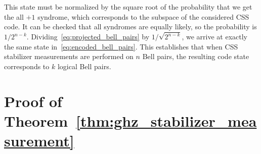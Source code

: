 \documentclass[journal,onecolumn]{IEEEtran}
\begin{document}
This state must be normalized by the square root of the probability that we get the all $+1$ syndrome, which corresponds to the subspace of the considered CSS code.
It can be checked that all syndromes are equally likely, so the probability is $1/2^{n-k}$.
Dividing~\eqref{eq:projected_bell_pairs} by $1/\sqrt{2^{n-k}}$, we arrive at exactly the same state in~\eqref{eq:encoded_bell_pairs}.
This establishes that when CSS stabilizer measurements are performed on $n$ Bell pairs, the resulting code state corresponds to $k$ logical Bell pairs.




\section{Proof of Theorem~\ref{thm:ghz_stabilizer_measurement}}
\label{sec:proof_ghz_stabilizer_measurement}
\end{document}
